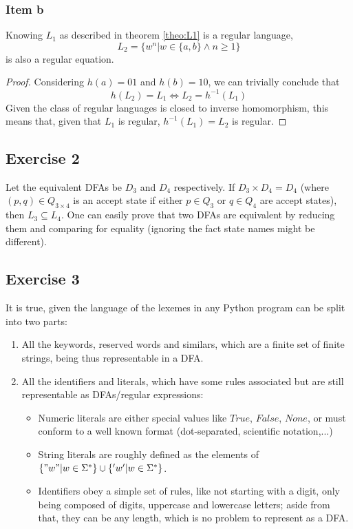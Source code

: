 {\subsubsection{Item b}
\begin{theorem}
	Knowing $L_1$ as described in theorem \ref{theo:L1} is a regular language,
	\begin{equation*}
		L_2 = \{w^n | w \in \{a,b\} \wedge n \geq 1 \}
	\end{equation*}
	is also a regular equation.
\end{theorem}
\begin{proof}
Considering $h(a)=01$ and $h(b)=10$, we can trivially conclude that
\begin{equation*}
	h(L_2)=L_1 \iff L_2 = h^{-1}(L_1)
\end{equation*}
Given the class of regular languages is closed to inverse homomorphism, this means that, given that $L_1$ is regular, $h^{-1}(L_1)=L_2$ is regular.
\end{proof}
}
\subsection{Exercise 2}
Let the equivalent DFAs be $D_3$ and $D_4$ respectively. If $D_3 \times D_4=D_4$ (where $(p,q)\in Q_{3 \times 4}$ is an accept state if either $p \in Q_3$ or $q \in Q_4$ are accept states), then $L_3 \subseteq L_4$. One can easily prove that two DFAs are equivalent by reducing them and comparing for equality (ignoring the fact state names might be different).
\subsection{Exercise 3}
It is true, given the language of the lexemes in any Python program can be split into two parts:
\begin{enumerate}
	\item All the keywords, reserved words and similars, which are a finite set of finite strings, being thus representable in a DFA.
	\item All the identifiers and literals, which have some rules associated but are still representable as DFAs/regular expressions:
	\begin{itemize}
		\item Numeric literals are either special values like $True$, $False$, $None$, or must conform to a well known format (dot-separated, scientific notation,...)
		\item String literals are roughly defined as the elements of $\{"w" | w \in \Sigma^\ast \} \cup \{'w' | w \in \Sigma^\ast \}$.
		\item Identifiers obey a simple set of rules, like not starting with a digit, only being composed of digits, uppercase and lowercase letters; aside from that, they can be any length, which is no problem to represent as a DFA.
	\end{itemize}
\end{enumerate}
